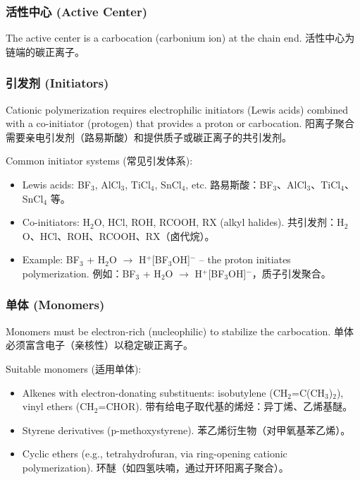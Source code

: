 \documentclass[12pt,a4paper]{ctexart}
\begin{document}
\subsubsection{活性中心 (Active Center)}
The active center is a carbocation (carbonium ion) at the chain end.  
活性中心为链端的碳正离子。

\subsubsection{引发剂 (Initiators)}
Cationic polymerization requires electrophilic initiators (Lewis acids) combined with a co-initiator (protogen) that provides a proton or carbocation.  
阳离子聚合需要亲电引发剂（路易斯酸）和提供质子或碳正离子的共引发剂。

Common initiator systems (常见引发体系):
\begin{itemize}
    \item Lewis acids: BF$_3$, AlCl$_3$, TiCl$_4$, SnCl$_4$, etc.  
      路易斯酸：BF$_3$、AlCl$_3$、TiCl$_4$、SnCl$_4$ 等。
    \item Co-initiators: H$_2$O, HCl, ROH, RCOOH, RX (alkyl halides).  
      共引发剂：H$_2$O、HCl、ROH、RCOOH、RX（卤代烷）。
    \item Example: BF$_3$ + H$_2$O $\rightarrow$ H$^+$[BF$_3$OH]$^-$ – the proton initiates polymerization.  
      例如：BF$_3$ + H$_2$O $\rightarrow$ H$^+$[BF$_3$OH]$^-$，质子引发聚合。
\end{itemize}

\subsubsection{单体 (Monomers)}
Monomers must be electron-rich (nucleophilic) to stabilize the carbocation.  
单体必须富含电子（亲核性）以稳定碳正离子。

Suitable monomers (适用单体):
\begin{itemize}
    \item Alkenes with electron-donating substituents: isobutylene (CH$_2$=C(CH$_3$)$_2$), vinyl ethers (CH$_2$=CHOR).  
      带有给电子取代基的烯烃：异丁烯、乙烯基醚。
    \item Styrene derivatives (p-methoxystyrene).  
      苯乙烯衍生物（对甲氧基苯乙烯）。
    \item Cyclic ethers (e.g., tetrahydrofuran, via ring-opening cationic polymerization).  
      环醚（如四氢呋喃，通过开环阳离子聚合）。
\end{itemize}
\end{document}

